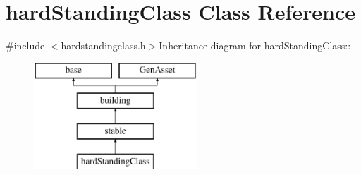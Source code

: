 \hypertarget{classhard_standing_class}{
\section{hardStandingClass Class Reference}
\label{classhard_standing_class}
}


{\ttfamily \#include $<$hardstandingclass.h$>$}Inheritance diagram for hardStandingClass::\begin{figure}[H]
\begin{center}
\leavevmode
\includegraphics[height=4cm]{classhard_standing_class}
\end{center}
\end{figure}
